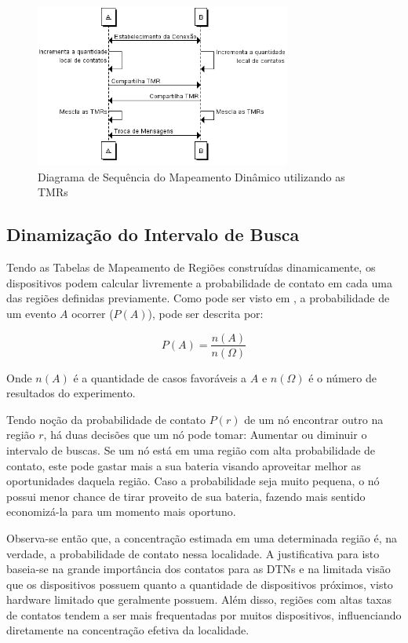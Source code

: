\begin{figure}[htp!]
\centering
\includegraphics[width=0.75\textwidth]{figuras/cap_4/mapeamento.png}
\caption{Diagrama de Sequência do Mapeamento Dinâmico utilizando as TMRs}
\label{mapeamento}
\end{figure}

\subsection{Dinamização do Intervalo de Busca}
\label{sec:dinamizacao_intervalo_busca}
Tendo as Tabelas de Mapeamento de Regiões construídas dinamicamente, os dispositivos podem calcular livremente a probabilidade de contato em cada uma das regiões definidas previamente. Como pode ser visto em \cite{hazzan2013fundamentos}, a probabilidade de um evento $A$ ocorrer ($P(A)$), pode ser descrita por:

\begin{equation}
P(A)=\frac{n(A)}{n(\Omega)}
\end{equation}

Onde $n(A)$ é a quantidade de casos favoráveis a $A$ e $n(\Omega)$ é o número de resultados do experimento.

Tendo noção da probabilidade de contato $P(r)$ de um nó encontrar outro na região $r$, há duas decisões que um nó pode tomar: Aumentar ou diminuir o intervalo de buscas. Se um nó está em uma região com alta probabilidade de contato, este pode gastar mais a sua bateria visando aproveitar melhor as oportunidades daquela região. Caso a probabilidade seja muito pequena, o nó possui menor chance de tirar proveito de sua bateria, fazendo mais sentido economizá-la para um momento mais oportuno.

Observa-se então que, a concentração estimada em uma determinada região é, na verdade, a probabilidade de contato nessa localidade. A justificativa para isto baseia-se na grande importância dos contatos para as DTNs e na limitada visão que os dispositivos possuem quanto a quantidade de dispositivos próximos, visto hardware limitado que geralmente possuem. Além disso, regiões com altas taxas de contatos tendem a ser mais frequentadas por muitos dispositivos, influenciando diretamente na concentração efetiva da localidade.

